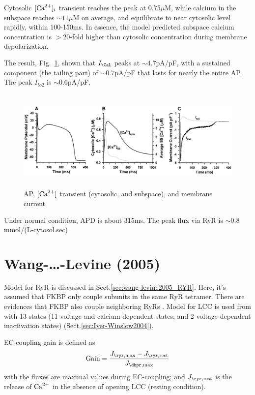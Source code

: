 Cytosolic $[{\text{Ca}^{2+}}]_i$ transient reaches the peak at 0.75$\mu$M, while
calcium in the subspace reaches $\sim 11\mu$M on average, and
equilibrate to near cytosolic level rapidly, within 100-150ms. In
essence, the model predicted subspace calcium concentration is
$>20$-fold higher than cytosolic concentration during membrane
depolarization. 

The result, Fig.~\ref{fig:Greenstein_fig9}, shown that $I_\CaL$ peaks
at $\sim 4.7$pA/pF, with a sustained component (the tailing part)
of $\sim 0.7$pA/pF that lasts for nearly the entire AP. The peak
$I_{to2}$ is $\sim 0.6$pA/pF. 

\begin{figure}[hbt]
  \centerline{\includegraphics[height=5cm,
    angle=0]{./images/Greenstein_fig9.eps}}
  \caption{AP, $[{\text{Ca}^{2+}}]$ transient (cytosolic, and subspace), and
    membrane current}
\label{fig:Greenstein_fig9}
\end{figure}


Under normal condition, APD is about 315ms. The peak flux via RyR is
$\sim 0.8$ mmol/(L-cytosol.sec)


\section{Wang-\ldots-Levine (2005)}
\label{sec:Wang-Levine2005}

Model for RyR is discussed in Sect.\ref{sec:wang-levine2005_RYR}. Here, it's
assumed that FKBP only couple subunits in the same RyR tetramer. There are
evidences that FKBP also couple neighboring RyRs \citep{marx1998, marx2001}. 
Model for LCC is used from \citep{iyer2004} with 13 states (11 voltage and
calcium-dependent states; and 2 voltage-dependent inactivation states)
(Sect.\ref{sec:Iyer-Winslow2004}). 

EC-coupling gain is defined as 
\begin{equation}
\text{Gain} = \frac{J_{\ryr,\max}-J_{\ryr,\rest}}{J_{\dhpr,\max}}
\end{equation}
with the fluxes are maximal values during EC-coupling; and $J_{\ryr,\rest}$ is
the release of ${\text{Ca}^{2+}}$ in the absence of opening LCC (resting condition). 

